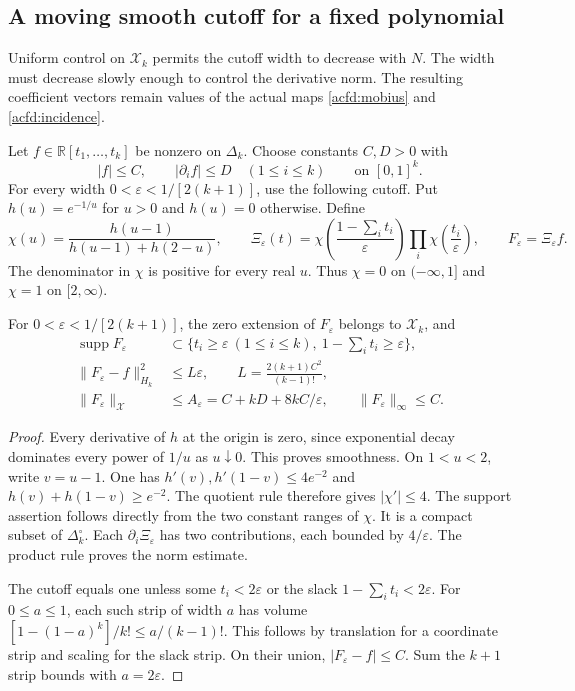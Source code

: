 \subsection{A moving smooth cutoff for a fixed polynomial}
\label{acfd:cutoff-subsection}

Uniform control on $\mathcal X_k$ permits the cutoff width to decrease with $N$.
The width must decrease slowly enough to control the derivative norm.
The resulting coefficient vectors remain values of the actual maps
\eqref{acfd:mobius} and \eqref{acfd:incidence}.

Let $f\in\mathbb R[t_1,\ldots,t_k]$ be nonzero on $\Delta_k$.
Choose constants $C,D>0$ with
\[
 |f|\leq C,\qquad |\partial_i f|\leq D\quad(1\leq i\leq k)
 \qquad\text{on }[0,1]^k.
\]
For every width $0<\varepsilon<1/[2(k+1)]$, use the following cutoff.
Put $h(u)=e^{-1/u}$ for $u>0$ and $h(u)=0$ otherwise.  Define
\[
 \chi(u)=\frac{h(u-1)}{h(u-1)+h(2-u)},\qquad
 \Xi_\varepsilon(t)=
       \chi\left(\frac{1-\sum_i t_i}{\varepsilon}\right)
       \prod_i\chi\left(\frac{t_i}{\varepsilon}\right),\qquad
 F_\varepsilon=\Xi_\varepsilon f.
\]
The denominator in $\chi$ is positive for every real $u$.
Thus $\chi=0$ on $(-\infty,1]$ and $\chi=1$ on $[2,\infty)$.

\begin{lemma}\label{acfd:cutoff}
For $0<\varepsilon<1/[2(k+1)]$, the zero extension of $F_\varepsilon$
belongs to $\mathcal X_k$, and
\begin{align*}
 \operatorname{supp}F_\varepsilon
   &\subset\{t_i\geq\varepsilon\ (1\leq i\leq k),
                        \ 1-\textstyle\sum_i t_i\geq\varepsilon\},\\
 \|F_\varepsilon-f\|_{H_k}^2
   &\leq L\varepsilon,\qquad L=\frac{2(k+1)C^2}{(k-1)!},\\
 \|F_\varepsilon\|_{\mathcal X}
   &\leq A_\varepsilon=C+kD+8kC/\varepsilon,
   \qquad \|F_\varepsilon\|_\infty\leq C.
\end{align*}
\end{lemma}

\begin{proof}
Every derivative of $h$ at the origin is zero, since exponential decay
dominates every power of $1/u$ as $u\downarrow0$.
This proves smoothness.  On $1<u<2$, write $v=u-1$.
One has $h'(v),h'(1-v)\leq4e^{-2}$ and
$h(v)+h(1-v)\geq e^{-2}$.
The quotient rule therefore gives $|\chi'|\leq4$.
The support assertion follows directly from the two constant ranges of $\chi$.
It is a compact subset of $\Delta_k^\circ$.
Each $\partial_i\Xi_\varepsilon$ has two contributions, each bounded by
$4/\varepsilon$.  The product rule proves the norm estimate.

The cutoff equals one unless some $t_i<2\varepsilon$ or the slack
$1-\sum_i t_i<2\varepsilon$.
For $0\leq a\leq1$, each such strip of width $a$ has volume
$[1-(1-a)^k]/k!\leq a/(k-1)!$.
This follows by translation for a coordinate strip and scaling for the slack strip.
On their union, $|F_\varepsilon-f|\leq C$.
Sum the $k+1$ strip bounds with $a=2\varepsilon$.
\end{proof}

